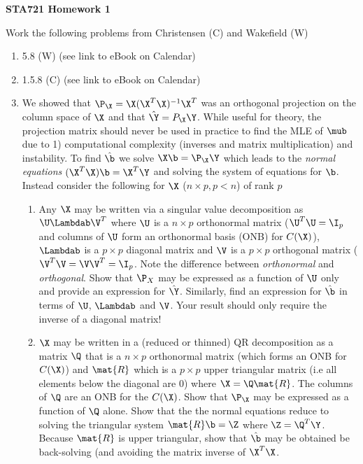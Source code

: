 \documentclass[12pt]{article}
\begin{document}
{\bf STA721 \hfill Homework 1}

\vspace{.5in}
\noindent
Work the following problems from Christensen (C) and Wakefield (W)
\begin{enumerate}
\item 5.8 (W)  (see link to eBook on Calendar)
\item 1.5.8 (C) (see link to eBook on Calendar)

\item We showed that $\P_\X = \X(\X^T\X)^{-1}\X^T$ was an orthogonal
  projection on the column space of $\X$ and that $\hat{\Y} = P_\X \Y$.
  While useful for theory, the projection matrix should never be used
  in practice to find the MLE of $\mub$ due to 1) computational
  complexity (inverses and matrix multiplication) and instability.  To
  find $\hat{\b}$ we solve $\X \b = \P_\X \Y $ which
  leads to the {\it normal equations}  $(\X^T\X) \b = \X^T\Y$ and
  solving the system of equations for $\b$.
  Instead consider the following for $\X$ ($n \times p, p < n$) of rank $p$

  \begin{enumerate}
  \item Any $\X$ may be written via a singular value decomposition as
    $\U \Lambdab \V^T$ where $\U$ is a $n \times p$ orthonormal matrix
    ($\U^T\U = \I_p$ and columns of $\U$ form an orthonormal basis (ONB) for
    $C(\X)$), $\Lambdab$ is a $p \times p$ diagonal matrix and $\V$ is
    a $p \times p$ orthogonal matrix ($\V^T\V = \V \V^T = \I_p$. Note
    the difference between {\it orthonormal} and {\it orthogonal}.
    Show that $\P_X$ may be expressed as a function of $\U$ only and
    provide an expression for $\hat{\Y}$.  Similarly, find an
    expression for $\hat{\b}$ in terms of $\U$, $\Lambdab$ and $\V$.
    Your result should only require the inverse of a diagonal matrix!
\item $\X$ may be written in a (reduced or thinned) QR decomposition as a matrix
  $\Q$ that is a $n \times p$ orthonormal matrix (which forms an ONB
  for $C(\X)$) and $\mat{R}$ which is a $p
  \times p$ upper triangular matrix (i.e all elements below the
  diagonal are 0) where $\X = \Q \mat{R}$. The columns of $\Q$ are an ONB for
  the $C(\X)$. Show that $\P_\X$
  may be expressed as a function of $\Q$ alone.   Show that  the 
 the normal equations reduce to solving the triangular system $\mat{R} \b = \Z$ where $\Z = \Q^T \Y$.
 Because $\mat{R}$ is upper triangular, show that $\hat{\b}$ may be
 obtained be back-solving (and avoiding the matrix inverse of $\X^T\X$.
   

\end{enumerate}
\end{enumerate}
\end{document}
